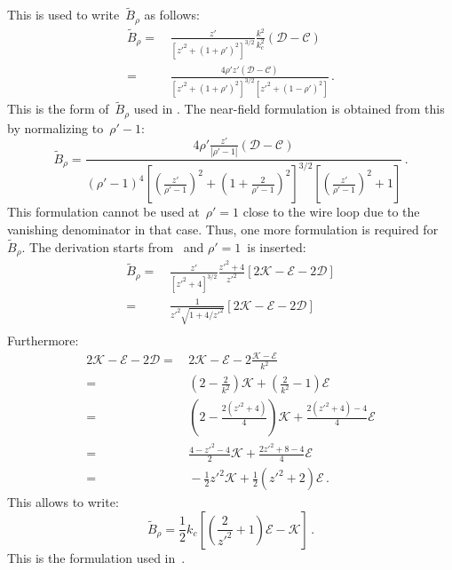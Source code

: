 This is used to write~$\tilde{B}_\rho$ as follows:
\begin{align}
  \tilde{B}_\rho
 =&\, \frac{z'}{\left[ z'^2 + (1 + \rho')^2 \right]^{3/2}} \frac{k^2}{k_c^2} \left(  \mathcal{D} - \mathcal{C} \right) \nonumber \\
 =&\, \frac{4 \rho' z' \left(  \mathcal{D} - \mathcal{C} \right) }{\left[ z'^2 + (1 + \rho')^2 \right]^{3/2} \left[ z'^2 + (1 - \rho')^2 \right]} \, .
\end{align}
This is the form of~$\tilde{B}_\rho$ used in .
The near-field formulation is obtained from this by normalizing to~$\rho'-1$:
\begin{equation}
  \tilde{B}_\rho
 = \frac{4 \rho' \frac{z'}{|\rho'-1|} \left( \mathcal{D} - \mathcal{C} \right) }
        {(\rho'-1)^4 \left[ \left(\frac{z'}{\rho'-1}\right)^2 + \left(1 + \frac{2}{\rho'-1}\right)^2 \right]^{3/2}
                     \left[ \left(\frac{z'}{\rho'-1}\right)^2 + 1 \right]} \, .
\end{equation}
This formulation cannot be used at~$\rho'=1$ close to the wire loop
due to the vanishing denominator in that case.
Thus, one more formulation is required for~$\tilde{B}_\rho$.
The derivation starts from~ and $\rho'=1$~is inserted:
\begin{align}
  \tilde{B}_\rho
 =&\, \frac{z'}{\left[ z'^2 + 4 \right]^{3/2}} \frac{z'^2 + 4}{z'^2} \left[ 2 \mathcal{K} - \mathcal{E} - 2 \mathcal{D} \right] \nonumber \\
 =&\, \frac{1}{z'^2 \sqrt{1 + 4/z'^2}} \left[ 2 \mathcal{K} - \mathcal{E} - 2 \mathcal{D} \right] \nonumber \\
\end{align}
Furthermore:
\begin{align}
      2 \mathcal{K} - \mathcal{E} - 2 \mathcal{D}
 =&\, 2 \mathcal{K} - \mathcal{E} - 2 \frac{\mathcal{K} - \mathcal{E}}{k^2} \nonumber \\
 =&\, \left( 2 - \frac{2}{k^2} \right) \mathcal{K} + \left( \frac{2}{k^2} - 1 \right) \mathcal{E} \nonumber \\
 =&\, \left( 2 - \frac{2(z'^2+4)}{4} \right) \mathcal{K} + \frac{2(z'^2+4) - 4}{4} \mathcal{E} \nonumber \\
 =&\, \frac{4 - z'^2 -4}{2} \mathcal{K} + \frac{2 z'^2 + 8 - 4}{4} \mathcal{E} \nonumber \\
 =&\, -\frac{1}{2} z'^2 \mathcal{K} + \frac{1}{2}\left(z'^2 +2\right) \mathcal{E} \, .
\end{align}
This allows to write:
\begin{equation}
 \tilde{B}_\rho = \frac{1}{2} k_c \left[ \left( \frac{2}{z'^2} + 1 \right) \mathcal{E} - \mathcal{K} \right] \, .
\end{equation}
This is the formulation used in~.

